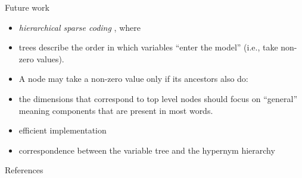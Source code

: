 \documentclass{beamer}
\newlength{\onecolwid}
\begin{document}
\begin{frame}[t]
\begin{columns}[t]
\begin{column}{\onecolwid}
  \begin{block}{Future work} 
    \begin{itemize}
      \item \emph{hierarchical sparse coding} \citep{Zhao:2009}, where
      \item trees describe the order in which variables “enter the model”
        (i.e., take non-zero values). 
      \item A node may take a non-zero value only if its ancestors also do:
      \item the dimensions that correspond to top level nodes should focus
        on “general” meaning components that are present in most words.
      \item efficient implementation \citet{Yogatama:2015} 
      \item correspondence between 
        the variable tree and the hypernym hierarchy
    \end{itemize}
  \end{block}

  \begin{block}{References}
    \footnotesize
    
     
  \end{block}
\end{column}
\end{columns} 
\end{frame} 
\end{document}
